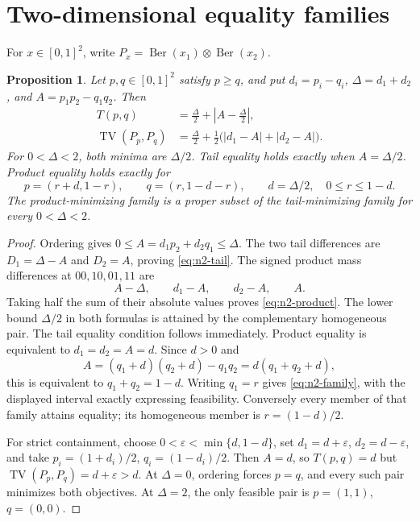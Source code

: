 \documentclass[11pt]{article}
\numberwithin{equation}{section}
\newtheorem{proposition}[theorem]{Proposition}
\theoremstyle{remark}\newtheorem{remark}[theorem]{Remark}
\DeclareMathOperator{\Ber}{Ber}
\DeclareMathOperator{\TV}{TV}
\begin{document}
\section{Two-dimensional equality families}\label{app:n2}
For $x\in[0,1]^2$, write $P_x=\Ber(x_1)\otimes\Ber(x_2)$.
\begin{proposition}\label{prop:n2-equality}
Let $p,q\in[0,1]^2$ satisfy $p\ge q$, and put
$d_i=p_i-q_i$, $\Delta=d_1+d_2$, and $A=p_1p_2-q_1q_2$. Then
\begin{align}
 T(p,q)&=\frac\Delta2+\left|A-\frac\Delta2\right|,
 \label{eq:n2-tail}\\
 \TV(P_p,P_q)&=\frac\Delta2+\frac12\bigl(|d_1-A|+|d_2-A|\bigr).
 \label{eq:n2-product}
\end{align}
For $0<\Delta<2$, both minima are $\Delta/2$. Tail equality holds
exactly when $A=\Delta/2$. Product equality holds exactly for
\begin{equation}\label{eq:n2-family}
 p=(r+d,1-r),\qquad q=(r,1-d-r),\qquad
 d=\Delta/2,\quad 0\le r\le1-d.
\end{equation}
The product-minimizing family is a proper subset of the tail-minimizing
family for every $0<\Delta<2$.
\end{proposition}
\begin{proof}
Ordering gives $0\le A=d_1p_2+d_2q_1\le\Delta$. The two tail differences
are $D_1=\Delta-A$ and $D_2=A$, proving \eqref{eq:n2-tail}.
The signed product mass differences at $00,10,01,11$ are
\[
 A-\Delta,\qquad d_1-A,\qquad d_2-A,\qquad A.
\]
Taking half the sum of their absolute values proves \eqref{eq:n2-product}.
The lower bound $\Delta/2$ in both formulas is attained by the
complementary homogeneous pair. The tail equality condition follows
immediately. Product equality is equivalent to $d_1=d_2=A=d$.
Since $d>0$ and
\[
 A=(q_1+d)(q_2+d)-q_1q_2=d(q_1+q_2+d),
\]
this is equivalent to $q_1+q_2=1-d$. Writing $q_1=r$ gives
\eqref{eq:n2-family}, with the displayed interval exactly expressing
feasibility. Conversely every member of that family attains equality;
its homogeneous member is $r=(1-d)/2$.

For strict containment, choose $0<\varepsilon<\min\{d,1-d\}$, set
$d_1=d+\varepsilon$, $d_2=d-\varepsilon$, and take
$p_i=(1+d_i)/2$, $q_i=(1-d_i)/2$. Then $A=d$, so
$T(p,q)=d$ but $\TV(P_p,P_q)=d+\varepsilon>d$.
At $\Delta=0$, ordering forces $p=q$, and every such pair minimizes both
objectives. At $\Delta=2$, the only feasible pair is $p=(1,1)$, $q=(0,0)$.
\end{proof}
\end{document}
